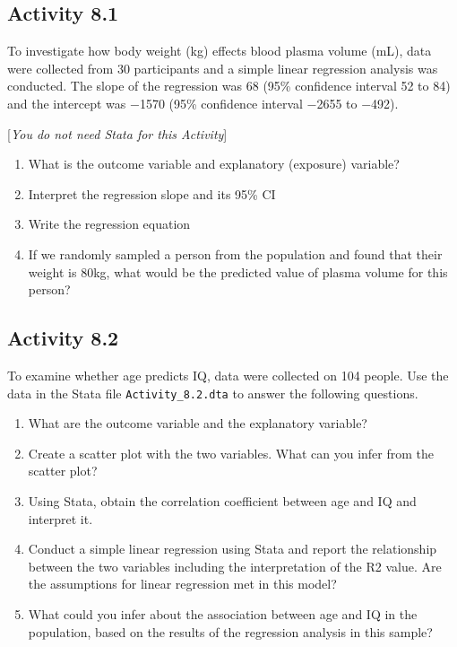 \documentclass[
]{memoir}
\providecommand{\tightlist}{%
  \setlength{\itemsep}{0pt}\setlength{\parskip}{0pt}}
\begin{document}
\hypertarget{activity-8.1}{%
\subsection*{Activity 8.1}\label{activity-8.1}}

To investigate how body weight (kg) effects blood plasma volume (mL), data were collected from 30 participants and a simple linear regression analysis was conducted. The slope of the regression was 68 (95\% confidence interval 52 to 84) and the intercept was −1570 (95\% confidence interval −2655 to −492).

{[}\emph{You do not need Stata for this Activity}{]}

\begin{enumerate}
\def\labelenumi{\alph{enumi})}
\tightlist
\item
  What is the outcome variable and explanatory (exposure) variable?
\item
  Interpret the regression slope and its 95\% CI
\item
  Write the regression equation
\item
  If we randomly sampled a person from the population and found that their weight is 80kg, what would be the predicted value of plasma volume for this person?
\end{enumerate}

\hypertarget{activity-8.2}{%
\subsection*{Activity 8.2}\label{activity-8.2}}

To examine whether age predicts IQ, data were collected on 104 people. Use the data in the Stata file \texttt{Activity\_8.2.dta} to answer the following questions.

\begin{enumerate}
\def\labelenumi{\alph{enumi})}
\tightlist
\item
  What are the outcome variable and the explanatory variable?
\item
  Create a scatter plot with the two variables. What can you infer from the scatter plot?
\item
  Using Stata, obtain the correlation coefficient between age and IQ and interpret it.
\item
  Conduct a simple linear regression using Stata and report the relationship between the two variables including the interpretation of the R2 value. Are the assumptions for linear regression met in this model?
\item
  What could you infer about the association between age and IQ in the population, based on the results of the regression analysis in this sample?
\end{enumerate}
\end{document}
